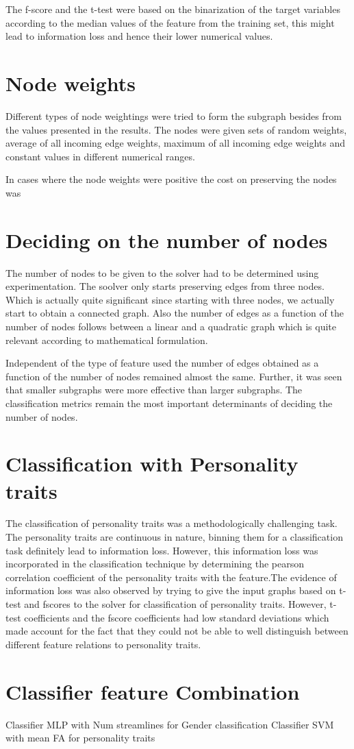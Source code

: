 \documentclass[msthesis.tex]{subfiles}
\begin{document}
The f-score and the t-test were based on the binarization of the target variables according to the median values of the feature from the training set, this might lead to information loss and hence their lower numerical values. 

\section{Node weights}
Different types of node weightings were tried to form the subgraph besides from the values presented in the results. The nodes were given sets of random weights, average of all incoming edge weights, maximum of all incoming edge weights and constant values in different numerical ranges. 

In cases where the node weights were positive the cost on preserving the nodes was 
\section{Deciding on the number of nodes}
The number of nodes to be given to the solver had to be determined using experimentation. The soolver only starts preserving edges from three nodes. Which is actually quite significant since starting with three nodes, we actually start to obtain a connected graph. Also the number of edges as a function of the number of nodes follows between a linear and a quadratic graph which is quite relevant according to mathematical formulation. 

Independent of the type of feature used the number of edges obtained as a function of the number of nodes remained almost the same. Further, it was seen that smaller subgraphs were more effective than larger subgraphs. The classification metrics remain the most important determinants of deciding the number of nodes. 

\section{Classification with Personality traits}
The classification of personality traits was a methodologically challenging task. The personality traits are continuous in nature, binning them for a classification task definitely lead to information loss. However, this information loss was incorporated in the classification technique by determining the pearson correlation coefficient of the personality traits with the feature.The evidence of information loss was also observed by trying to give the input graphs based on t-test and fscores to the solver for classification of personality traits. However, t-test coefficients and the fscore coefficients had low standard deviations which made account for the fact that they could not be able to well distinguish between different feature relations to personality traits. 
\section{Classifier feature Combination}
Classifier MLP with Num streamlines for Gender classification
Classifier SVM with mean FA for personality traits
\end{document}
